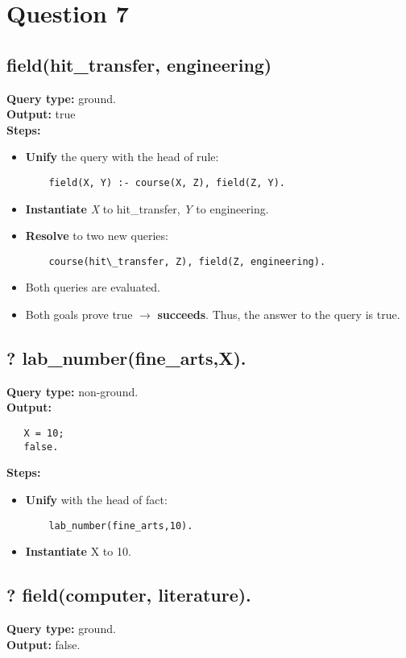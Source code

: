 \newpage
\section{Question 7}

\subsection{field(hit\_transfer, engineering)}
\textbf{Query type: } ground. \\
\textbf{Output:} true \\
\textbf{Steps:}
\begin{itemize}
    \item \textbf{Unify} the query with the head of rule:
    \begin{lstlisting}
    field(X, Y) :- course(X, Z), field(Z, Y).
    \end{lstlisting}
    \item \textbf{Instantiate} \textit{X} to hit\_transfer, \textit{Y} to engineering.
    \item \textbf{Resolve} to two new queries:
    \begin{lstlisting}
    course(hit\_transfer, Z), field(Z, engineering).
    \end{lstlisting}
\item Both queries are evaluated. 
\item Both goals prove true $\to $ \textbf{succeeds}. Thus, the answer to the query is true. 
\end{itemize}

\subsection{? lab\_number(fine\_arts,X).}
\textbf{Query type: } non-ground. \\
\textbf{Output:} 
\begin{lstlisting}
   X = 10;
   false.
\end{lstlisting}

\textbf{Steps:} 
\begin{itemize}
    \item \textbf{Unify} with the head of fact:
    \begin{lstlisting}
    lab_number(fine_arts,10).
    \end{lstlisting}
\item \textbf{Instantiate} X to 10.
\end{itemize}

\subsection{? field(computer, literature).}
\textbf{Query type: } ground. \\
\textbf{Output:} false. \\

